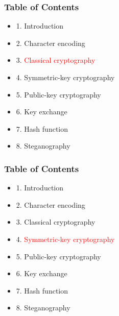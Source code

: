 \documentclass[handout, xcolor=dvipsnames,aspectratio=169]{beamer}
\begin{document}

\begin{frame}
  \centering
  \frametitle{Table of Contents}
  \begin{itemize}
    \item 1. Introduction
    \item 2. Character encoding
    \item 3. \textcolor{red}{Classical cryptography}
    \item 4. Symmetric-key cryptography
    \item 5. Public-key cryptography
    \item 6. Key exchange
    \item 7. Hash function
    \item 8. Steganography
  \end{itemize}  
\end{frame}

\begin{frame}
  \centering
  \frametitle{Table of Contents}
  \begin{itemize}
    \item 1. Introduction
    \item 2. Character encoding
    \item 3. Classical cryptography
    \item 4. \textcolor{red}{Symmetric-key cryptography}
    \item 5. Public-key cryptography
    \item 6. Key exchange
    \item 7. Hash function
    \item 8. Steganography
  \end{itemize}  
\end{frame}

\end{document}
